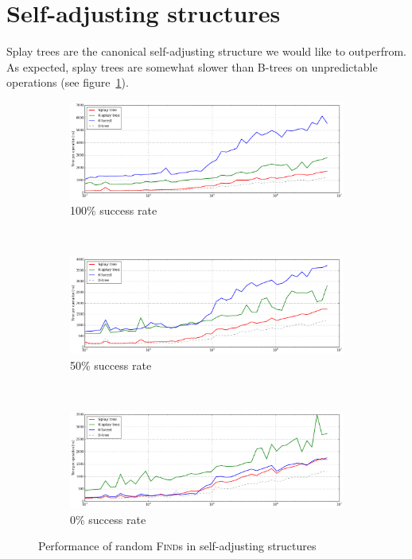 \section{Self-adjusting structures}
Splay trees are the canonical self-adjusting structure we would like to
outperfrom. As expected, splay trees are somewhat slower than B-trees on
unpredictable operations (see figure~\ref{fig:self-adj-performance-finds}).

\begin{figure}
\begin{subfigure}[t]{\textwidth}
	\includegraphics[width=\textwidth]{img/performance/self-adj-random-find-100}
	\caption{100\% success rate}
\end{subfigure}
\\
\begin{subfigure}[t]{\textwidth}
	\includegraphics[width=\textwidth]{img/performance/self-adj-random-find-50}
	\caption{50\% success rate}
\end{subfigure}
\\
\begin{subfigure}[t]{\textwidth}
	\includegraphics[width=\textwidth]{img/performance/self-adj-random-find-0}
	\caption{0\% success rate}
\end{subfigure}
\caption{Performance of random \textsc{Find}s in self-adjusting structures}
\label{fig:self-adj-performance-finds}
\end{figure}

